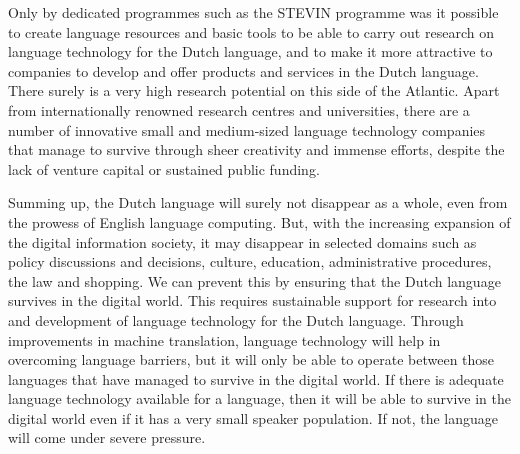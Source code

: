 \begin{multicols}{2}
Only by dedicated programmes such as the STEVIN programme was it possible to create language resources and basic tools to be able to carry out research on language technology for the Dutch language, and to make it more attractive to companies to develop and offer products and services in the Dutch language. There surely is a very high research potential on this side of the Atlantic. Apart from internationally renowned research centres and universities, there are a number of innovative small and medium-sized language technology companies that manage to survive through sheer creativity and immense efforts, despite the lack of venture capital or sustained public funding.

Summing up, the Dutch language will surely not disappear as a whole, even from the prowess of English language computing. But, with the increasing expansion of the digital information society, it may disappear in selected domains such as policy discussions and decisions, culture, education, administrative procedures, the law and shopping. We can prevent this by ensuring that the Dutch language survives in the digital world. This requires sustainable support for research into and development of language technology for the Dutch language. Through improvements in machine translation, language technology will help in overcoming language barriers, but it will only be able to operate between those languages that have managed to survive in the digital world. If there is adequate language technology available for a language, then it will be able to survive in the digital world even if it has a very small speaker population. If not, the language will come under severe pressure.


\end{multicols}

\clearpage



